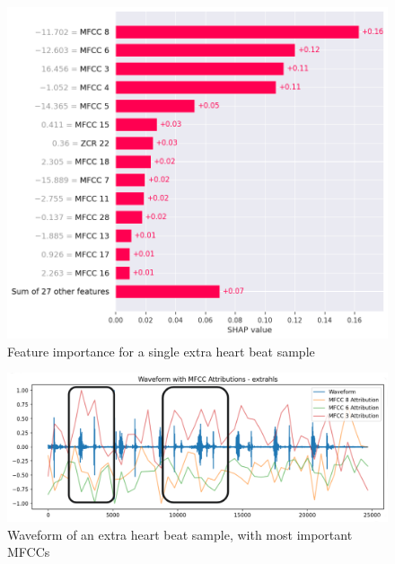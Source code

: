 \begin{figure}[H]
    \centering
    \includegraphics[width=\columnwidth]{../images/extrahls_feature_importance.png}
    \caption{Feature importance for a single extra heart beat sample}
    \label{fig:extrahls_feature_importance}
\end{figure}

\begin{figure}[H]
    \centering
    \includegraphics[width=\columnwidth]{../images/extrahls_waveform.png}
    \caption{Waveform of an extra heart beat sample, with most important MFCCs}
    \label{fig:extrahls_waveform}
\end{figure}
